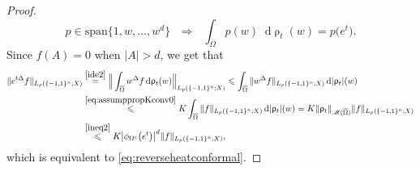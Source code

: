 \documentclass[11pt,reqno]{amsart}
\renewcommand{\leq}{\leqslant}
\newcommand{\1}{\mathbf 1}
\theoremstyle{remark}
\renewcommand{\rho}{\uprho}
\renewcommand{\rho}{\uprho}
\newcommand*\diff{\mathop{}\!\mathrm{d}}
\newcommand{\ms}{\mathscr}
\begin{document}
\begin{proof}
\begin{equation}
p\in\mathrm{span}\{1,w,\ldots,w^d\} \ \ \ \Longrightarrow \ \ \ \int_{\overline{\Omega}} p(w)\diff\rho_t(w) = p\big(e^t\big).
\end{equation}
Since $\widehat{f}(A)=0$ when $|A|>d$, we get that
\begin{equation}
\begin{split}
\|e^{t\Delta}f\|_{L_p(\{-1,1\}^n;X)}& \stackrel{\eqref{ide2}}{=} \Big\| \int_{\overline{\Omega}} w^\Delta f \diff\rho_t(w)\Big\|_{L_p(\{-1,1\}^n;X)} \leq \int_{\overline{\Omega}} \|w^\Delta f\|_{L_p(\{-1,1\}^n;X)} \diff|\rho_t|(w)
\\ & \stackrel{\eqref{eq:assumppropKconv0}}{\leq} K \int_{\overline{\Omega}} \|f\|_{L_p(\{-1,1\}^n;X)} \diff|\rho_t|(w) = K\|\rho_t\|_{\ms{M}(\overline{\Omega})} \|f\|_{L_p(\{-1,1\}^n;X)}
\\ & \stackrel{\eqref{ineq2}}{\leq} K\big| \phi_{\Omega^c}\big(e^{t}\big)\big|^d \|f\|_{L_p(\{-1,1\}^n;X)},
\end{split}
\end{equation}
which is equivalent to \eqref{eq:reverseheatconformal}.
\end{proof}
\end{document}
